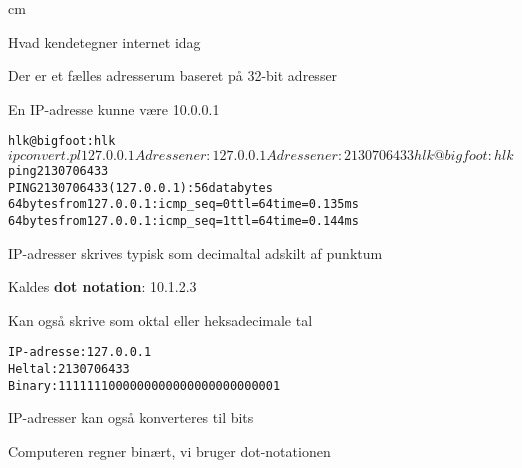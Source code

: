 \documentclass[Screen16to9,17pt,footrule]{foils}
\begin{document}


 cm

\begin{list1}
\item Hvad kendetegner internet idag
\item Der er et fælles adresserum baseret på 32-bit adresser
\item En IP-adresse kunne være 10.0.0.1
\end{list1}


\begin{alltt}
hlk@bigfoot:hlk$ ipconvert.pl 127.0.0.1
Adressen er: 127.0.0.1
Adressen er: 2130706433
hlk@bigfoot:hlk$ ping 2130706433
PING 2130706433 (127.0.0.1): 56 data bytes
64 bytes from 127.0.0.1: icmp_seq=0 ttl=64 time=0.135 ms
64 bytes from 127.0.0.1: icmp_seq=1 ttl=64 time=0.144 ms
\end{alltt}

\begin{list1}
\item IP-adresser skrives typisk som decimaltal adskilt af punktum
\item Kaldes {\bf dot notation}: 10.1.2.3
\item Kan også skrive som oktal eller heksadecimale tal
\end{list1}




\begin{alltt}
IP-adresse: 127.0.0.1
Heltal:	2130706433
Binary:	1111111000000000000000000000001
\end{alltt}

\begin{list1}
\item IP-adresser kan også konverteres til bits
\item Computeren regner binært, vi bruger dot-notationen
\end{list1}

\end{document}
